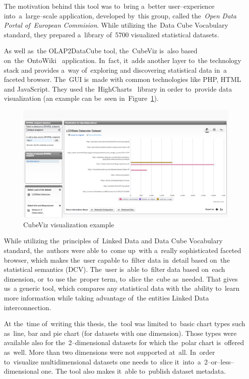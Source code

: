 The motivation behind this tool was to~bring a~better user--experience into~a~large--scale application, developed by~this group, called the~\emph{Open Data Portal of~European Commision}. While utilizing the~Data Cube Vocabulary standard, they 
prepared a~library of~5700 visualized statistical datasets.

\begin{sloppypar}
As well as~the OLAP2DataCube tool, the~CubeViz is~also based on~the~\mbox{OntoWiki}~\cite{ontowiki}
application. In~fact, it~adds another layer to~the 
technology stack and provides a~way of~exploring and discovering statistical 
data in~a faceted browser. The~GUI is~made with common technologies like PHP,
HTML and JavaScript. They used the~HighCharts~\cite{highcharts} library in
order to~provide data visualization (an example can be~seen in~Figure~\ref{fig:cubeviz}).
\end{sloppypar}

\begin{figure}
	\centering
	\includegraphics[width=140mm]{img/cubeviz.png}
	\caption{CubeViz visualization example}
	\label{fig:cubeviz}
\end{figure}

While utilizing the~principles of~Linked Data and Data Cube Vocabulary 
standard, the~authors were able to~come up~with a~really sophisticated faceted 
browser, which makes the~user capable to~filter data in~detail based on~the statistical 
semantics (DCV). The~user is~able to~filter data based on~each dimension, or~to use the~proper term, to~slice the~cube as~needed. That gives us~a generic tool, which 
compares any statistical data with the~ability to~learn more 
information while taking advantage of~the entities Linked Data interconnection.

At the~time of~writing this thesis, the~tool was limited to~basic chart types
such as~line, bar and pie chart (for datasets with one dimension). Those types 
were available also for the~2--dimensional datasets for which the~polar 
chart is~offered as~well. More than two dimensions were not supported at~all. In~order to~visualize 
multidimensional datasets one needs to~slice it~into~a~2--or--less--dimensional one.
The tool also makes it~able to~publish dataset metadata.

